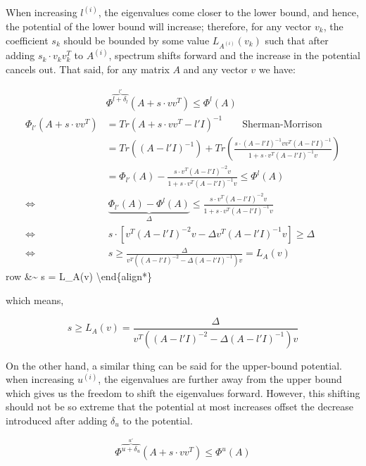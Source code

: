 \documentclass[
  letterpaper,
  DIV=11,
  numbers=noendperiod]{scrartcl}
\theoremstyle{plain}
\theoremstyle{plain}
\theoremstyle{plain}
\theoremstyle{definition}
\theoremstyle{remark}
\begin{document}
When increasing \(l^{(i)}\), the eigenvalues come closer to the lower
bound, and hence, the potential of the lower bound will increase;
therefore, for any vector \(v_k\), the coefficient \(s_k\) should be
bounded by some value \(L_{A^{(i)}}(v_k)\) such that after adding
\(s_k \cdot v_k v_k^T\) to \(A^{(i)}\), spectrum shifts forward and the
increase in the potential cancels out. That said, for any matrix \(A\)
and any vector \(v\) we have:

\begin{align*}
&\Phi^{\overset{l'}{\overbrace{l + \delta_l}}}(A + s \cdot vv^T) \le \Phi^l(A)\\
\Phi_{l'}(A + s \cdot vv^T) & = Tr(A + s \cdot vv^T - l'I)^{-1}  \qquad \text{Sherman-Morrison}\\\
& = Tr\left((A - l'I)^{-1}\right) + Tr\left(\frac{s \cdot (A - l'I)^{-1} v v^T (A - l'I)^{-1}}{1 + s \cdot v^T (A - l' I)^{-1} v}\right)\\
&= \Phi_{l'}(A) - \frac{s \cdot v^T (A - l'I)^{-2}v}{1 + s \cdot v^T  (A - l'I)^{-1}v} \le \Phi^l(A)\\
\Leftrightarrow &~ \underset{\Delta}{\underbrace{\Phi_{l'}(A) - \Phi^l(A)}} \le \frac{s \cdot v^T (A - l'I)^{-2}v}{1 + s \cdot v^T  (A - l'I)^{-1}v}\\
\Leftrightarrow &~ s\cdot \left[v^T (A - l'I)^{-2}v  - \Delta v^T(A - l' I)^{-1} v\right] \ge \Delta\\
\Leftrightarrow &~ s \ge \frac{\Delta}{v^T \left( (A - l'I)^{-2} - \Delta (A - l' I)^{-1} \right) v} = L_A(v)
\end{align*}row \&\textasciitilde{} s
\ge {}
= L\_A(v) \textbackslash end\{align*\}

which means,

\begin{equation} \tag{1}\label{eq:lower-bound-potential}
s \ge L_A(v) = \frac{\Delta}{v^T \left((A - l' I)^{-2} - \Delta (A - l' I)^{-1} \right) v}
\end{equation}

On the other hand, a similar thing can be said for the upper-bound
potential. when increasing \(u^{(i)}\), the eigenvalues are further away
from the upper bound which gives us the freedom to shift the eigenvalues
forward. However, this shifting should not be so extreme that the
potential at most increases offset the decrease introduced after adding
\(\delta_u\) to the potential.

\[ 
\Phi^{\overset{u'}{\overbrace{u + \delta_u}}}(A + s \cdot vv^T) \le \Phi^u(A)
\]
\end{document}
